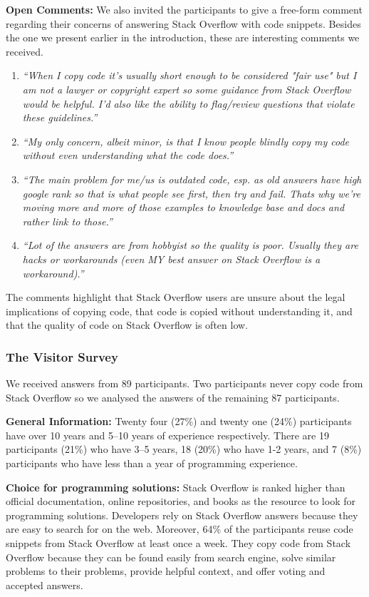 \documentclass[10pt,journal,compsoc]{IEEEtran}
\begin{document}
\textbf{Open Comments:} We also invited the participants to give a
free-form comment regarding their concerns of answering Stack Overflow with code
snippets. Besides the one we present earlier in the introduction, these are
interesting comments we received.

\begin{enumerate}
	\item \textit{``When I copy code it's usually short enough to be considered "fair
		use" but I am not a lawyer or copyright expert so some guidance from Stack Overflow would be
		helpful. I'd also like the ability to flag/review questions that violate these
		guidelines.''}
	\item \textit{``My only concern, albeit minor, is that I know people blindly copy
		my code without even understanding what the code does.''}
	\item \textit{``The main problem for me/us is outdated code, esp. as old answers
		have high google rank so that is what people see first, then try and fail. Thats
		why we're moving more and more of those examples to knowledge base and docs and
		rather link to those.''}
	\item \textit{``Lot of the answers are from hobbyist so the quality is poor.
		Usually they are hacks or workarounds (even MY best answer on Stack Overflow is a
		workaround).''}
\end{enumerate}

The comments highlight that Stack Overflow users are unsure about the
legal implications of copying code, that code is copied without
understanding it, and that the quality of code on Stack Overflow is
often low.

\subsubsection{The Visitor Survey}

We received answers from 89 participants. 
Two participants never
copy code from Stack Overflow so we analysed the answers of the remaining 87
participants.

\textbf{General Information: }
Twenty four (27\%) and twenty one (24\%) participants have over 10 years and 5--10
years of experience respectively. There are 19 participants (21\%) who have 3--5
years, 18 (20\%) who have 1-2 years, and 7 (8\%) participants who have less than a
year of programming experience.

\textbf{Choice for programming solutions: }
Stack Overflow is ranked higher than official documentation, online
repositories, and books as the resource to look for programming solutions.
Developers rely on Stack Overflow answers because they are easy to search for on
the web. Moreover, 64\% of the participants reuse code snippets from Stack
Overflow at least once a week. They copy code from Stack Overflow because they
can be found easily from search engine, solve similar problems to their
problems, provide helpful context, and offer voting and accepted answers. 
\end{document}
